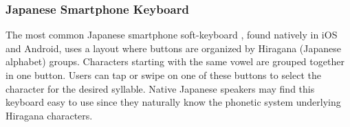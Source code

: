 \subsubsection{Japanese Smartphone Keyboard}
The most common Japanese smartphone soft-keyboard \cite{japanese-smartphone-keyboard}, found natively in iOS and Android, uses a layout where buttons are organized by Hiragana (Japanese alphabet) groups. Characters starting with the same vowel are grouped together in one button. Users can tap or swipe on one of these buttons to select the character for the desired syllable. Native Japanese speakers may find this keyboard easy to use since they naturally know the phonetic system underlying Hiragana characters.



